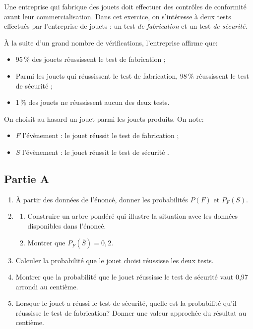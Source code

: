Une entreprise qui fabrique des jouets doit effectuer des contrôles de conformité avant leur commercialisation. Dans cet exercice, on s'intéresse à deux tests effectués par l'entreprise de jouets : un test \emph{de fabrication} et un test \emph{de sécurité}.

\medskip

À la suite d'un grand nombre de vérifications, l'entreprise affirme que:

\begin{itemize}[label=$\bullet~$]
\item 95\,\% des jouets réussissent le test de fabrication ;
\item Parmi les jouets qui réussissent le test de fabrication, 98\,\% réussissent le test de sécurité ;
\item 1\,\% des jouets ne réussissent aucun des deux tests.
\end{itemize}

On choisit au hasard un jouet parmi les jouets produits. On note:

\begin{itemize}[label=$\bullet~$]
\item $F$ l'évènement : \og le jouet réussit le test de fabrication \fg{} ;
\item $S$ l'évènement : \og le jouet réussit le test de sécurité \fg.
\end{itemize}

\subsection*{Partie A}

\begin{enumerate}
\item À partir des données de l'énoncé, donner les probabilités $P(F)$ et $P_F(S)$.
\item
	\begin{enumerate}
		\item Construire un arbre pondéré qui illustre la situation avec les données disponibles dans l'énoncé.
		\item Montrer que $P_{\overline{F}}\left(\overline{S}\right) = 0,2$.
\end{enumerate}
\item Calculer la probabilité que le jouet choisi réussisse les deux tests.
\item Montrer que la probabilité que le jouet réussisse le test de sécurité vaut 0,97 arrondi au centième.
\item Lorsque le jouet a réussi le test de sécurité, quelle est la probabilité qu'il réussisse le test de fabrication? Donner une valeur approchée du résultat au centième.
\end{enumerate}

